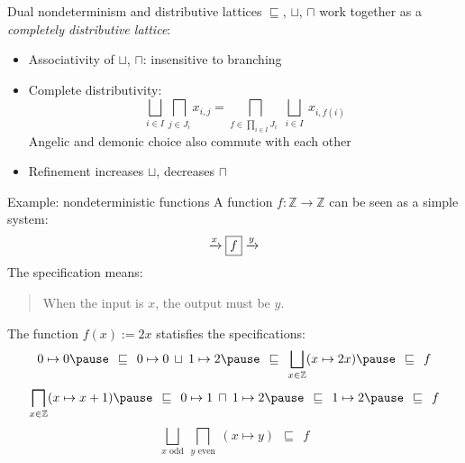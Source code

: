 \documentclass{beamer}
\begin{document}
\begin{frame}{Dual nondeterminism and distributive lattices} %
  $\sqsubseteq$, $\sqcup$, $\sqcap$ work together as a
  \emph{completely distributive lattice}:
  \begin{itemize}
    \item Associativity of $\sqcup$, $\sqcap$: insensitive to branching
    \item Complete distributivity:
      \[
        \bigsqcup_{i \in I} \bigsqcap_{j \in J_i} x_{i,j} =
        \bigsqcap_{f \in \prod_{i \in I} J_i \:\:}
          \bigsqcup_{i \in I} \: x_{i,f(i)}
      \]
      Angelic and demonic choice also commute with each other
    \item Refinement increases $\sqcup$, decreases $\sqcap$
  \end{itemize}
\end{frame}

\begin{frame}{Example: nondeterministic functions} %
A function $f : \mathbb{Z} \rightarrow \mathbb{Z}$
can be seen as a simple system:
\[
  \xrightarrow{x} \fbox{$f$} \xrightarrow{y}
\]
The specification  means:
\begin{quotation}
\vspace{1ex}
  When the input is $x$, the output must be $y$.
\end{quotation}

\pause
The function $f(x) := 2x$ statisfies the specifications:
\[
  0 \mapsto 0 \pause \:\:\sqsubseteq\:\:
  0 \mapsto 0 \:\sqcup\: 1 \mapsto 2 \pause \:\:\sqsubseteq\:\:
  \bigsqcup_{x \in \mathbb{Z}} (x \mapsto 2x) \pause \:\:\sqsubseteq\:\: f
\]
\pause
\[
  \bigsqcap_{x \in \mathbb{Z}} (x \mapsto x + 1) \pause \:\:\sqsubseteq\:\:
  0 \mapsto 1 \:\sqcap\: 1 \mapsto 2 \pause \:\:\sqsubseteq\:\:
  1 \mapsto 2 \pause \:\:\sqsubseteq\:\:
  f
\]
\pause
\[
  \bigsqcup_{x \text{ odd}} \: \bigsqcap_{y \text{ even}} \: (x \mapsto y)
  \:\:\sqsubseteq\:\:
  f
\]
\end{frame}
\end{document}
